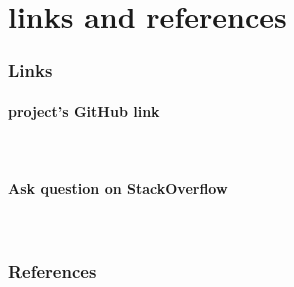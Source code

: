 \documentclass[12pt,a4paper]{article}
\begin{document}
	\part{links and references}\label{linkAndRef}
	
	\section{Links}\label{linkAndRef.links}
	\subsection*{project's GitHub link}
	\href{https://github.com/Matin0789/FinalFight.git}{\color{blue}{https://github.com/Matin0789/FinalFight.git}}\\
	\subsection*{Ask question on StackOverflow}
	\href{https://stackoverflow.com/questions/78055082/crashing-a-c-codes}{\color{blue}{https://stackoverflow.com/questions/78055082/crashing-a-c-codes}}\\
	
	\section{References}\label{linkAndRef.ref}
	\href{https://www.geeksforgeeks.org/c-plus-plus/}{\color{blue}{https://www.geeksforgeeks.org/c-plus-plus/}}\\
	\href{https://www.programiz.com/cpp-programming}{\color{blue}{https://www.programiz.com/cpp-programming}}

	 
\end{document}
